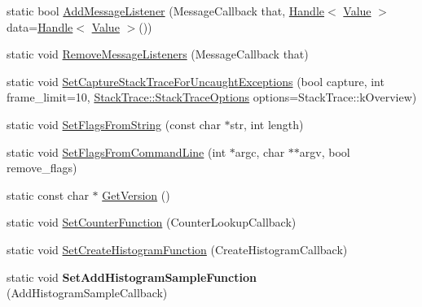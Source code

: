 \begin{DoxyCompactItemize}
\item 
static bool \hyperlink{classv8_1_1_v8_a125dadf8feb6178a42333f2a6412ea73}{Add\+Message\+Listener} (Message\+Callback that, \hyperlink{classv8_1_1_handle}{Handle}$<$ \hyperlink{classv8_1_1_value}{Value} $>$ data=\hyperlink{classv8_1_1_handle}{Handle}$<$ \hyperlink{classv8_1_1_value}{Value} $>$())
\item 
static void \hyperlink{classv8_1_1_v8_a024f57744e8dfdcb2ea1417024b4805c}{Remove\+Message\+Listeners} (Message\+Callback that)
\item 
static void \hyperlink{classv8_1_1_v8_a9998ccddad62571d73039ea12f598236}{Set\+Capture\+Stack\+Trace\+For\+Uncaught\+Exceptions} (bool capture, int frame\+\_\+limit=10, \hyperlink{classv8_1_1_stack_trace_a9704e4a37949eb8eb8ccddbddf161492}{Stack\+Trace\+::\+Stack\+Trace\+Options} options=Stack\+Trace\+::k\+Overview)
\item 
static void \hyperlink{classv8_1_1_v8_ab263a85e6f97ea79d944bd20bb09a95f}{Set\+Flags\+From\+String} (const char $\ast$str, int length)
\item 
static void \hyperlink{classv8_1_1_v8_a63157ad9284ffad1c0ab62b21aadd08c}{Set\+Flags\+From\+Command\+Line} (int $\ast$argc, char $\ast$$\ast$argv, bool remove\+\_\+flags)
\item 
static const char $\ast$ \hyperlink{classv8_1_1_v8_afcecc0e9e8b5fa17a06a93f7b5a7538d}{Get\+Version} ()
\item 
static void \hyperlink{classv8_1_1_v8_a830d3ba2704b6e7c361188b22318c0be}{Set\+Counter\+Function} (Counter\+Lookup\+Callback)
\item 
static void \hyperlink{classv8_1_1_v8_ac4db0dff0f29c750d30fcac65c4d1968}{Set\+Create\+Histogram\+Function} (Create\+Histogram\+Callback)
\item 
\hypertarget{classv8_1_1_v8_acbd552ca4282f1a7648c221aa70ff93e}{}static void {\bfseries Set\+Add\+Histogram\+Sample\+Function} (Add\+Histogram\+Sample\+Callback)\label{classv8_1_1_v8_acbd552ca4282f1a7648c221aa70ff93e}


\end{DoxyCompactItemize}
